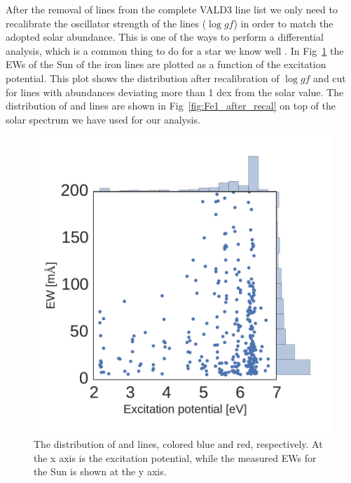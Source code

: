 \documentclass{aa}
\begin{document}
After the removal of lines from the complete VALD3 line list we only
need to recalibrate the oscillator strength of the lines ($\log
\mathit{gf}$) in order to match the adopted solar abundance. This is
one of the ways to perform a differential analysis, which is a common
thing to do for a star we know well \citep{Sousa2008a,Onehag2012}.
In Fig~\ref{fig:Fe1_before_recal} the EWs of the Sun of the iron
lines are plotted as a function of the excitation potential. This
plot shows the distribution after recalibration of $\log gf$ and
cut for lines with abundances deviating more than 1 dex from the
solar value. The distribution of  and  lines are shown in
Fig~\ref{fig:Fe1_after_recal} on top of the solar spectrum we have used
for our analysis.


\begin{figure}[tpb]
    \centering
    \includegraphics[width=1.0\linewidth]{figures/EWvsEP.pdf}
    \caption{The distribution of  and  lines,
    colored blue and red, respectively. At the x axis is
    the excitation potential, while the measured EWs for the Sun is
    shown at the y axis.}
    \label{fig:Fe1_before_recal}
\end{figure}
\end{document}
